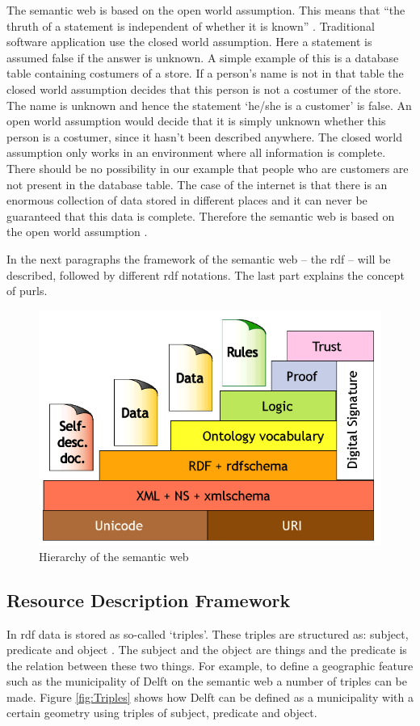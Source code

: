 The semantic web is based on the open world assumption. This means that \enquote{the thruth of a statement is independent of whether it is known} \citep[p. 103]{LD:Hebeler}. Traditional software application use the closed world assumption. Here a statement is assumed false if the answer is unknown. A simple example of this is a database table containing costumers of a store. If a person's name is not in that table the closed world assumption decides that this person is not a costumer of the store. The name is unknown and hence the statement `he/she is a customer' is false. An open world assumption would decide that it is simply unknown whether this person is a costumer, since it hasn't been described anywhere. The closed world assumption only works in an environment where all information is complete. There should be no possibility in our example that people who are customers are not present in the database table. The case of the internet is that there is an enormous collection of data stored in different places and it can never be guaranteed that this data is complete. Therefore the semantic web is based on the open world assumption \citep{LD:Hebeler}. 

In the next paragraphs the framework of the semantic web --  the \acf{rdf} -- will be described, followed by different \ac{rdf} notations. The last part explains the concept of \acp{purl}.

\begin{figure}[!h]
	\centering
	\includegraphics[width=0.7\linewidth]{figs/semanticweb2.png}
	\caption{Hierarchy of the semantic web \protect\footnotemark}
	\label{fig:SemanticWeb}
\end{figure}

\subsection{Resource Description Framework}
In \ac{rdf} data is stored as so-called `triples'. These triples are structured as: subject, predicate and object \citep{LD:Berners-lee}. The subject and the object are things and the predicate is the relation between these two things. For example, to define a geographic feature such as the municipality of Delft on the semantic web a number of triples can be made. Figure \ref{fig:Triples} shows how Delft can be defined as a municipality with a certain geometry using triples of subject, predicate and object.

